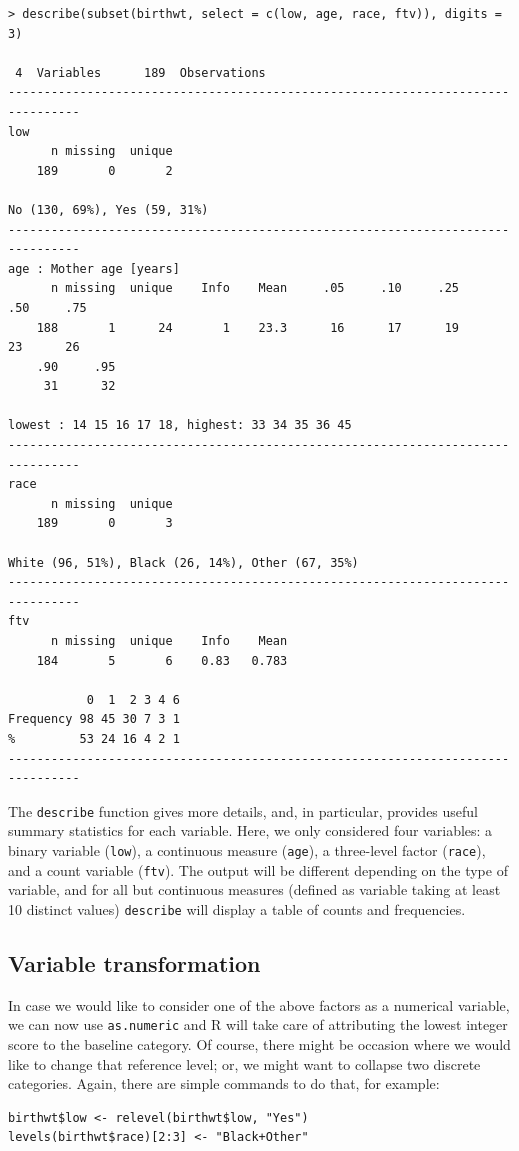 \documentclass[a4paper,twoside]{book}
\renewcommand{\texttt}[1]{\lstinline{#1}}
\newcommand{\R}{\textsf{R}\xspace}
\begin{document}
\begin{verbatim}
> describe(subset(birthwt, select = c(low, age, race, ftv)), digits = 3)

 4  Variables      189  Observations
--------------------------------------------------------------------------------
low
      n missing  unique
    189       0       2

No (130, 69%), Yes (59, 31%)
--------------------------------------------------------------------------------
age : Mother age [years]
      n missing  unique    Info    Mean     .05     .10     .25     .50     .75
    188       1      24       1    23.3      16      17      19      23      26
    .90     .95
     31      32

lowest : 14 15 16 17 18, highest: 33 34 35 36 45
--------------------------------------------------------------------------------
race
      n missing  unique
    189       0       3

White (96, 51%), Black (26, 14%), Other (67, 35%)
--------------------------------------------------------------------------------
ftv
      n missing  unique    Info    Mean
    184       5       6    0.83   0.783

           0  1  2 3 4 6
Frequency 98 45 30 7 3 1
%         53 24 16 4 2 1
--------------------------------------------------------------------------------
\end{verbatim}

The \texttt{describe} function gives more details, and, in particular,
provides useful summary statistics for each variable. Here, we only
considered four variables: a binary variable (\texttt{low}), a continuous
measure (\texttt{age}), a three-level factor (\texttt{race}), and a count
variable (\texttt{ftv}). The output will be different depending on the type
of variable, and for all but continuous measures (defined as variable taking
at least 10 distinct values) \texttt{describe} will display a table of
counts and frequencies.

\subsection{Variable transformation}
In case we would like to consider one of the above factors as a
numerical variable, we can now use \texttt{as.numeric} and \R will
take care of attributing the lowest integer score to the baseline
category. Of course, there might be occasion where we would like to
change that reference level; or, we might want to collapse two
discrete categories. Again, there are simple commands to do that, for
example:
\begin{verbatim}
birthwt$low <- relevel(birthwt$low, "Yes")
levels(birthwt$race)[2:3] <- "Black+Other"
\end{verbatim}
\end{document}
